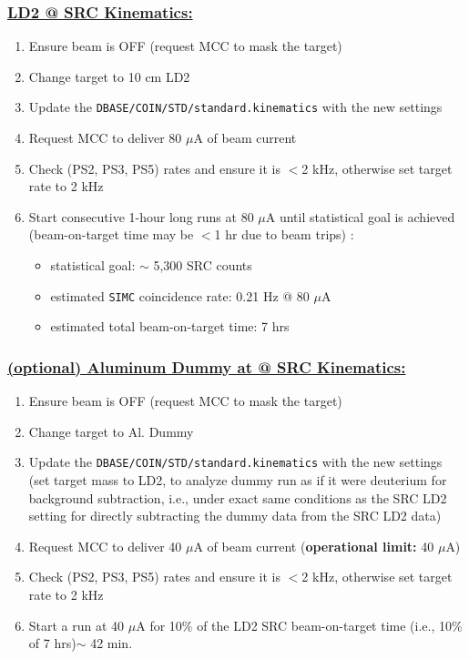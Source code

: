 \documentclass{article}
\begin{document}
\subsubsection*{\underline{LD2 @ SRC Kinematics:}}
\begin{enumerate}
\item Ensure beam is OFF (request MCC to mask the target)
\item Change target to 10 cm LD2
\item Update the \texttt{DBASE/COIN/STD/standard.kinematics} with the new settings
\item Request MCC to deliver 80 $\mu$A of beam current
\item Check (PS2, PS3, PS5) rates and ensure it is $<$2 kHz, otherwise set target rate to 2 kHz
\item Start consecutive 1-hour long runs at 80 $\mu$A until statistical goal is achieved \\ (beam-on-target time may be $<$1 hr due to beam trips) :
\begin{itemize}
    \item statistical goal: $\sim$ 5,300 SRC counts
    \item estimated \texttt{SIMC} coincidence rate: 0.21 Hz @ 80 $\mu$A
    \item estimated total beam-on-target time: 7 hrs
\end{itemize}
\end{enumerate}

\subsubsection*{\underline{ (optional) Aluminum Dummy at @ SRC Kinematics:}}
\begin{enumerate}
\item Ensure beam is OFF (request MCC to mask the target)
\item Change target to Al. Dummy
\item Update the \texttt{DBASE/COIN/STD/standard.kinematics} with the new settings\\
(set target mass to LD2, to analyze dummy run as if it were deuterium for background subtraction, i.e., under exact same conditions as the SRC LD2 setting for directly subtracting the dummy data from the SRC LD2 data)
\item Request MCC to deliver 40 $\mu$A of beam current (\textbf{operational limit:} 40 $\mu$A)
\item Check (PS2, PS3, PS5) rates and ensure it is $<$2 kHz, otherwise set target rate to 2 kHz
\item Start a run at 40 $\mu$A for 10\% of the LD2 SRC beam-on-target time (i.e., 10\% of 7 hrs)$\sim$ 42 min. 

\end{enumerate}
\end{document}
